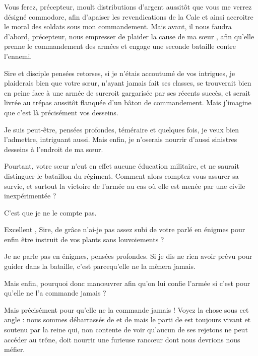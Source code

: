 \begin{drama}
  \elenaspeaks   Vous ferez, précepteur, moult distributions d’argent aussitôt que vous me verrez désigné commodore, afin d’apaiser les revendications de la Cale et ainsi accroitre le moral des soldats sous mon commandement.  Mais avant, il nous faudra d’abord, précepteur, nous empresser de plaider la cause de ma sœur \ela, afin qu’elle prenne le commandement des armées et engage une seconde bataille contre l’ennemi.

  \alexasspeaks Sire et disciple \elena pensées retorses, si je n’étais accoutumé de vos intrigues, je plaiderais bien que \ela votre sœur, n’ayant jamais fait ses classes, se trouverait bien en peine face à une armée de surcroit gargarisée par ses récents succès, et serait livrée au trépas aussitôt flanquée d’un bâton de commandement. Mais j’imagine que c’est là précisément vos desseins.

  \elenaspeaks  {} Je suis peut-être, \alexas pensées profondes, téméraire et quelques fois, je veux bien l’admettre, intriguant aussi.
  Mais enfin, je n’oserais nourrir d’aussi sinistres desseins à l’endroit de ma sœur.

  \alexasspeaks Pourtant, votre sœur n’eut en effet aucune éducation militaire, et ne saurait distinguer le bataillon du régiment. Comment alors comptez-vous assurer sa survie, et surtout la victoire de l’armée  au cas où elle est menée par une civile inexpérimentée ?

  \elenaspeaks  C’est que je ne le compte pas.

  \alexasspeaks Excellent \elena, Sire, de grâce n’ai-je pas assez subi de votre parlé en énigmes pour enfin être instruit de vos plants sans louvoiements ?

  \elenaspeaks  Je ne parle pas en énigmes, \alexas pensées profondes. Si je dis ne rien avoir prévu pour guider \ela{} dans la bataille, c’est parcequ’elle ne la mènera jamais.

  \alexasspeaks Mais enfin, pourquoi donc manœuvrer afin qu’on lui confie l’armée si c’est pour qu’elle ne l’a commande jamais ?

  \elenaspeaks  Mais précisément pour qu’elle ne la commande jamais ! Voyez la chose sous cet angle : nous sommes débarrassés de \general{} et de \princesse{} mais le parti de \princesse{} est toujours vivant et soutenu par la reine qui, non contente de voir qu’aucun de ses rejetons ne peut accéder au trône, doit nourrir une furieuse rancœur dont nous devrions nous méfier.


\end{drama}
